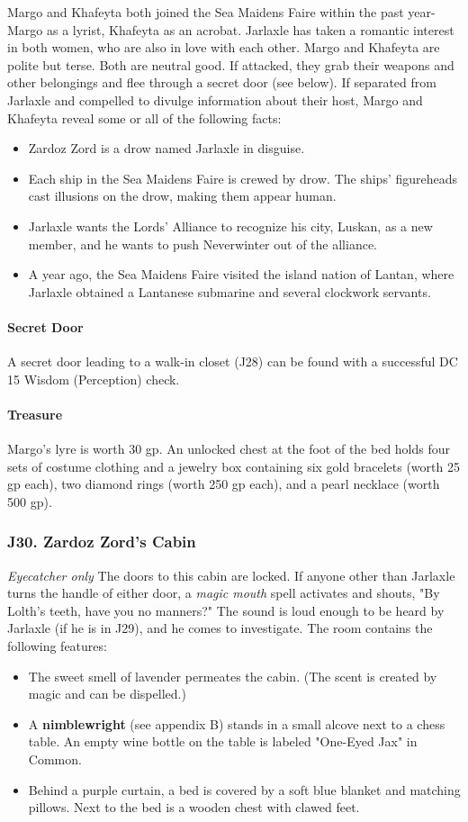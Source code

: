 \documentclass[10pt,a4paper,twoside,twocolumn,openany,nodeprecatedcode]{dndbook}
\begin{document}
Margo and Khafeyta both joined the Sea Maidens Faire within the past year-Margo as a lyrist, Khafeyta as an acrobat. Jarlaxle has taken a romantic interest in both women, who are also in love with each other.
Margo and Khafeyta are polite but terse. Both are neutral good. If attacked, they grab their weapons and other belongings and flee through a secret door (see below).
If separated from Jarlaxle and compelled to divulge information about their host, Margo and Khafeyta reveal some or all of the following facts:
\begin{itemize}

\item Zardoz Zord is a drow named Jarlaxle in disguise.
\item Each ship in the Sea Maidens Faire is crewed by drow. The ships' figureheads cast illusions on the drow, making them appear human.
\item Jarlaxle wants the Lords' Alliance to recognize his city, Luskan, as a new member, and he wants to push Neverwinter out of the alliance.
\item A year ago, the Sea Maidens Faire visited the island nation of Lantan, where Jarlaxle obtained a Lantanese submarine and several clockwork servants.
\end{itemize}


\paragraph{Secret Door}
A secret door leading to a walk-in closet (J28) can be found with a successful DC 15 Wisdom (Perception) check.
\paragraph{Treasure}
Margo's lyre is worth 30 gp. An unlocked chest at the foot of the bed holds four sets of costume clothing and a jewelry box containing six gold bracelets (worth 25 gp each), two diamond rings (worth 250 gp each), and a pearl necklace (worth 500 gp).
\subsubsection{J30. Zardoz Zord's Cabin}
\textit{Eyecatcher only}
The doors to this cabin are locked. If anyone other than Jarlaxle turns the handle of either door, a \textit{magic mouth} spell activates and shouts, "By Lolth's teeth, have you no manners?" The sound is loud enough to be heard by Jarlaxle (if he is in J29), and he comes to investigate.
The room contains the following features:
\begin{itemize}

\item The sweet smell of lavender permeates the cabin. (The scent is created by magic and can be dispelled.)
\item A \textbf{nimblewright} (see appendix B) stands in a small alcove next to a chess table. An empty wine bottle on the table is labeled "One-Eyed Jax" in Common.
\item Behind a purple curtain, a bed is covered by a soft blue blanket and matching pillows. Next to the bed is a wooden chest with clawed feet.
\end{itemize}
\end{document}
